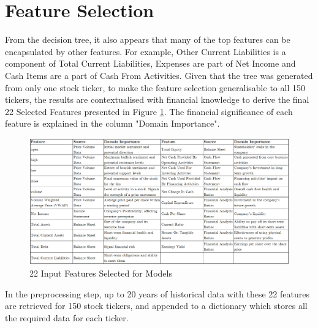 \documentclass[a4paper,12pt]{report}
\numberwithin{equation}{section}
\theoremstyle{definition}
\begin{document}
\section{Feature Selection}
From the decision tree, it also appears that many of the top features can be encapsulated by other features. For example, Other Current Liabilities is a component of Total Current Liabilities, Expenses are part of Net Income and Cash Items are a part of Cash From Activities. Given that the tree was generated from only one stock ticker, to make the feature selection generalisable to all 150 tickers, the results are contextualised with financial knowledge to derive the final 22 Selected Features presented in Figure \ref{fig:selected_features}. The financial significance of each feature is explained in the column "Domain Importance".
\begin{figure}[H]
  \centerline{\includegraphics[width=20cm]{selected_features}}
  \caption{22 Input Features Selected for Models}
  \label{fig:selected_features}
\end{figure}
In the preprocessing step, up to 20 years of historical data with these 22 features are retrieved for 150 stock tickers, and appended to a dictionary which stores all the required data for each ticker.

\iffalse

\begin{figure}[H]
  \centering
\end{figure}
\end{document}

